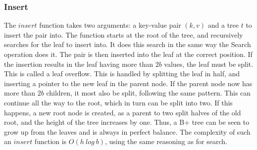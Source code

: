 \subsubsection{Insert}
The $insert$ function takes two arguments: a key-value pair $(k, v)$ and a tree $t$ to insert the pair into. The function starts at the root of the tree, and recursively searches for the leaf to insert into. It does this search in the same way the Search operation does it. The pair is then inserted into the leaf at the correct position. If the insertion results in the leaf having more than $2b$ values, the leaf must be split. This is called a leaf overflow. This is handled by splitting the leaf in half, and inserting a pointer to the new leaf in the parent node. If the parent node now has more than $2b$ children, it most also be split, following the same pattern. This can continue all the way to the root, which in turn can be split into two. If this happens, a new root node is created, as a parent to two split halves of the old root, and the height of the tree increases by one. Thus, a B+ tree can be seen to grow up from the leaves and is always in perfect balance. The complexity of such an $insert$ function is $O(h~log~b)$, using the same reasoning as for search.
